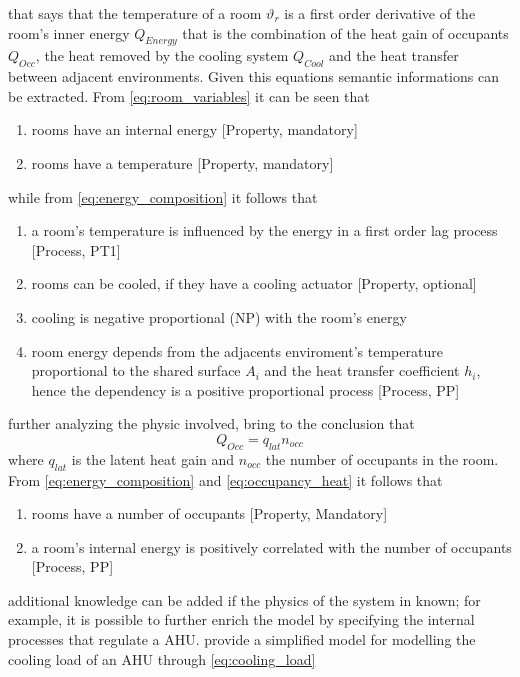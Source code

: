 that says that the temperature of a room $\vartheta_r$ is a first order derivative of the room's inner energy $Q_{Energy}$ that is the combination of the heat gain of occupants $Q_{Occ}$, the heat removed by the cooling system $Q_{Cool}$ and the heat transfer between adjacent environments. Given this equations semantic informations can be extracted.
From \autoref{eq:room_variables} it can be seen that
\begin{enumerate}[noitemsep]
  \item rooms have an internal energy [Property, mandatory]
  \item rooms have a temperature [Property, mandatory]
\end{enumerate}
while from \autoref{eq:energy_composition} it follows that
\begin{enumerate}
  \item a room's temperature is influenced by the energy in a first order lag process [Process, PT1]
  \item rooms can be cooled, if they have a cooling actuator [Property, optional]
  \item cooling is negative proportional (NP) with the room's energy
  \item room energy depends from the adjacents enviroment's temperature proportional to the shared surface $A_i$ and the heat transfer coefficient $h_i$, hence the dependency is a positive proportional process [Process, PP]
\end{enumerate}
further analyzing the physic involved, bring to the conclusion that
\begin{equation}
  Q_{Occ}=q_{lat}n_{occ} \label{eq:occupancy_heat}
\end{equation}
where $q_{lat}$ is the latent heat gain and $n_{occ}$ the number of occupants in the room. From  \autoref{eq:energy_composition} and \ref{eq:occupancy_heat} it follows that
\begin{enumerate}
  \item rooms have a number of occupants [Property, Mandatory]
  \item a room's internal energy is positively correlated with the number of occupants [Process, PP]
\end{enumerate}
additional knowledge can be added if the physics of the system in known; for example, it is possible to further enrich the model by specifying the internal processes that regulate a AHU. \textcite{building_ahu_physics} provide a simplified model for modelling the cooling load of an AHU through \autoref{eq:cooling_load}
